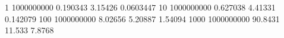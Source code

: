 1 1000000000 0.190343 3.15426 0.0603447
10 1000000000 0.627038 4.41331 0.142079
100 1000000000 8.02656 5.20887 1.54094
1000 1000000000 90.8431 11.533 7.8768
